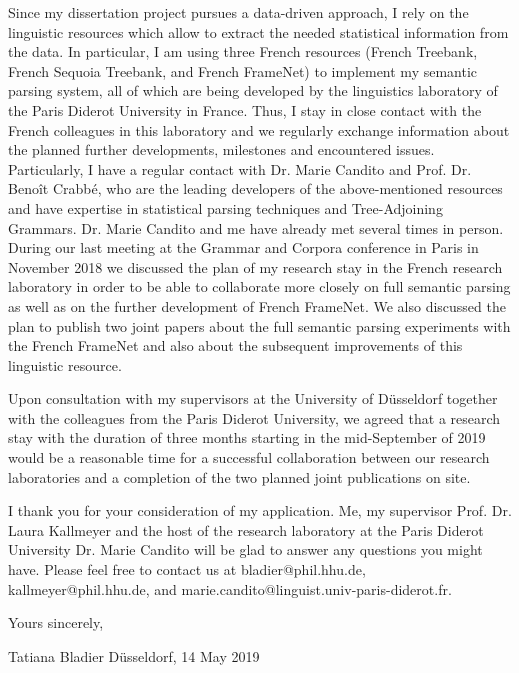 \documentclass{resume} %
\begin{document}
Since my dissertation project pursues a data-driven approach, I rely on the linguistic resources which allow to extract the needed statistical information from the data. In particular, I am using three French resources (French Treebank, French Sequoia Treebank, and French FrameNet) to implement my semantic parsing system, all of which are being developed by the linguistics laboratory of the Paris Diderot University in France. Thus, I stay in close contact with the French colleagues in this laboratory and we regularly exchange information about the planned further developments, milestones and encountered issues. Particularly, I have a regular contact with Dr. Marie Candito and Prof. Dr. Beno\^{i}t Crabb\'{e}, who are the leading developers of the above-mentioned resources and have expertise in statistical parsing techniques and Tree-Adjoining Grammars. Dr. Marie Candito and me have already met several times in person. During our last meeting at the Grammar and Corpora conference in Paris in November 2018 we discussed the plan of my research stay in the French research laboratory in order to be able to collaborate more closely on full semantic parsing as well as on the further development of French FrameNet. We also discussed the plan to publish two joint papers about the full semantic parsing experiments with the French FrameNet and also about the subsequent improvements of this linguistic resource. 

Upon consultation with my supervisors at the University of D{\"u}sseldorf together with the colleagues from the Paris Diderot University, we agreed that a research stay with the duration of three months starting in the mid-September of 2019 would be a reasonable time for a successful collaboration between our research laboratories and a completion of the two planned joint publications on site.

I thank you for your consideration of my application. Me, my supervisor Prof. Dr. Laura Kallmeyer and the host of the research laboratory at the Paris Diderot University Dr. Marie Candito will be glad to answer any questions you might have. Please feel free to contact us at bladier@phil.hhu.de, kallmeyer@phil.hhu.de, and  marie.candito@linguist.univ-paris-diderot.fr.

Yours sincerely,

Tatiana Bladier \hfill D{\"u}sseldorf, 14 May 2019





%
%
\end{document}
